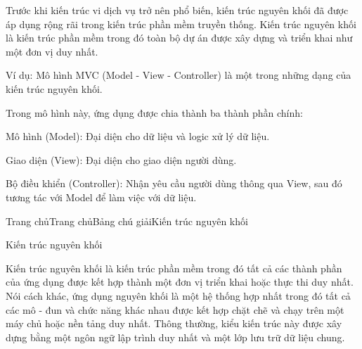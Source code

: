 Trước khi kiến trúc vi dịch vụ trở nên phổ biến, kiến trúc nguyên khối đã được áp dụng rộng rãi trong kiến trúc phần mềm truyền thống. Kiến trúc nguyên khối là kiến trúc phần mềm trong đó toàn bộ dự án được xây dựng và triển khai như một đơn vị duy nhất.

Ví dụ: Mô hình MVC (Model - View - Controller) là một trong những dạng của kiến trúc nguyên khối.

Trong mô hình này, ứng dụng được chia thành ba thành phần chính:

Mô hình (Model): Đại diện cho dữ liệu và logic xử lý dữ liệu.

Giao diện (View): Đại diện cho giao diện người dùng.

Bộ điều khiển (Controller): Nhận yêu cầu người dùng thông qua View, sau đó tương tác với Model để làm việc với dữ liệu.










Trang chủTrang chủBảng chú giảiKiến trúc nguyên khối

Kiến trúc nguyên khối

Kiến trúc nguyên khối là kiến trúc phần mềm trong đó tất cả các thành phần của ứng dụng được kết hợp thành một đơn vị triển khai hoặc thực thi duy nhất. Nói cách khác, ứng dụng nguyên khối là một hệ thống hợp nhất trong đó tất cả các mô - đun và chức năng khác nhau được kết hợp chặt chẽ và chạy trên một máy chủ hoặc nền tảng duy nhất. Thông thường, kiểu kiến trúc này được xây dựng bằng một ngôn ngữ lập trình duy nhất và một lớp lưu trữ dữ liệu chung.

